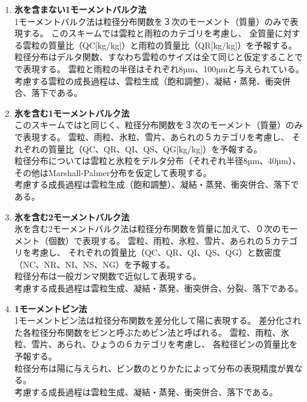\begin{enumerate}
\item {\bf 氷を含まない1モーメントバルク法\cite{kessler_1969}}\\
1モーメントバルク法は粒径分布関数を３次のモーメント（質量）のみで表現する。
このスキームでは雲粒と雨粒のカテゴリを考慮し、
全質量に対する雲粒の質量比（QC[kg/kg]）と雨粒の質量比（QR[kg/kg]）を予報する。\\
粒径分布はデルタ関数、すなわち雲粒のサイズは全て同じと仮定することでで表現する。
雲粒と雨粒の半径はそれぞれ8µm、100µmと与えられている。\\
考慮する雲粒の成長過程は、雲粒生成（飽和調整）、凝結・蒸発、衝突併合、落下である。

\item {\bf 氷を含む1モーメントバルク法\cite{tomita_2008}}\\
このスキームでは\cite{kessler_1969}と同じく、粒径分布関数を３次のモーメント（質量）のみで表現する。
雲粒、雨粒、氷粒、雪片、あられの５カテゴリを考慮し、
それぞれの質量比（QC、QR、QI、QS、QG[kg/kg]）を予報する。\\
粒径分布については雲粒と氷粒をデルタ分布（それぞれ半径8µm、40µm）、
その他はMarshall-Palmer分布を仮定して表現する。\\
考慮する成長過程は雲粒生成（飽和調整）、凝結・蒸発、衝突併合、落下である。

\item {\bf 氷を含む2モーメントバルク法\cite{sn_2014}}\\
氷を含む2モーメントバルク法は粒径分布関数を質量に加えて、０次のモーメント（個数）で表現する。
雲粒、雨粒、氷粒、雪片、あられの５カテゴリを考慮し、
それぞれの質量比（QC、QR、QI、QS、QG）と数密度（NC、NR、NI、NS、NG）を予報する。\\
粒径分布は一般ガンマ関数で近似して表現する。\\
考慮する成長過程は雲粒生成、凝結・蒸発、衝突併合、分裂、落下である。

\item {\bf 1モーメントビン法\cite{suzuki_etal_2010}}\\
1モーメントビン法は粒径分布関数を差分化して陽に表現する。
差分化された各粒径分布関数をビンと呼ぶためビン法と呼ばれる。
雲粒、雨粒、氷粒、雪片、あられ、ひょうの６カテゴリを考慮し、
各粒径ビンの質量比を予報する。\\
粒径分布は陽に与えられ、ビン数のとりかたによって分布の表現精度が異なる。\\
考慮する成長過程は雲粒生成、凝結・蒸発、衝突併合、落下である。

\end{enumerate}

